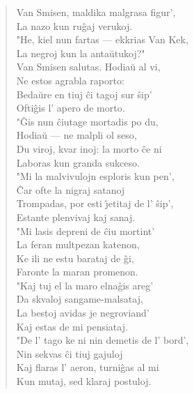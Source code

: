 \begin{verse}
                  \vin  Van Smisen, maldika malgrasa figur',\\
                 La nazo kun ru\^gaj verukoj.\\
                 "He, kiel nun fartas --- ekkrias Van Kek,\\
                 La negroj kun la anta\u utukoj?"\\
                  \vin  Van Smisen salutas. Hodia\u u al vi,\\
                 Ne estos agrabla raporto:\\
                 Beda\u ure en tiuj \^ci tagoj sur \^sip'\\
                 Ofti\^gis l' apero de morto.\\
                  \vin  "\^Gis nun \^ciutage mortadis po du,\\
                 Hodia\u u --- ne malpli ol seso,\\
                 Du viroj, kvar inoj: la morto \^ce ni\\
                 Laboras kun granda sukceso.\\
                 \vin   "Mi la malvivulojn esploris kun pen',\\
                 \^Car ofte la nigraj satanoj\\
                 Trompadas, por esti \^{\j}etitaj de l' \^sip',\\
                 Estante plenvivaj kaj sanaj.\\
                 \vin   "Mi lasis depreni de \^ciu mortint'\\
                 La feran multpezan katenon,\\
                 Ke ili ne estu barataj de \^gi,\\
                 Faronte la maran promenon.\\
                  \vin  "Kaj tuj el la maro elna\^gis areg'\\
                 Da skvaloj sangame-malsataj,\\
                 La bestoj avidas je negroviand'\\
                 Kaj estas de mi pensiataj.\\
                  \vin  "De l' tago ke ni nin demetis de l' bord',\\
                 Nin sekvas \^ci tiuj gajuloj\\
                 Kaj flaras l' aeron, turni\^gas al mi\\
                 Kun mutaj, sed klaraj postuloj.\\

\end{verse}
